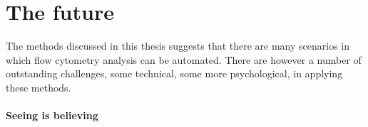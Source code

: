 


\section{ The future }

The methods discussed in this thesis suggests that there are many scenarios in which flow cytometry analysis can be automated.
There are however a number of outstanding challenges, some technical, some more psychological, in applying these methods.

\paragraph{Seeing is believing}

